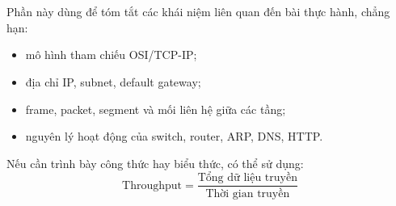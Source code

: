 \section{\sectiontheorytitle}
Phần này dùng để tóm tắt các khái niệm liên quan đến bài thực hành, chẳng hạn:
\begin{itemize}[leftmargin=2em]
    \item mô hình tham chiếu OSI/TCP-IP;
    \item địa chỉ IP, subnet, default gateway;
    \item frame, packet, segment và mối liên hệ giữa các tầng;
    \item nguyên lý hoạt động của switch, router, ARP, DNS, HTTP.
\end{itemize}

Nếu cần trình bày công thức hay biểu thức, có thể sử dụng:
\begin{equation}
    \text{Throughput} = \frac{\text{Tổng dữ liệu truyền}}{\text{Thời gian truyền}}
\end{equation}

